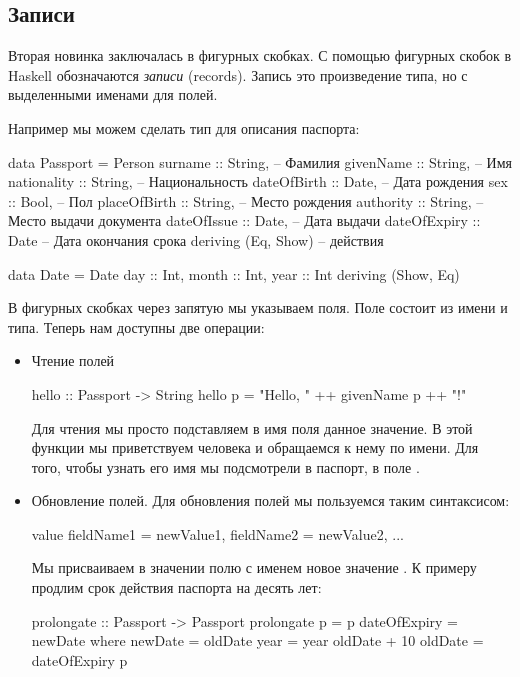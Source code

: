 \subsection{Записи}

Вторая новинка заключалась в фигурных скобках. 
С помощью фигурных скобок в Haskell обозначаются 
\emph{записи} (records). Запись это произведение
типа, но с выделенными именами для полей.

Например мы можем сделать тип для описания паспорта:

\begin{code}
data Passport   = Person {
    surname         :: String,      -- Фамилия
    givenName       :: String,      -- Имя
    nationality     :: String,      -- Национальность
    dateOfBirth     :: Date,        -- Дата рождения
    sex             :: Bool,        -- Пол
    placeOfBirth    :: String,      -- Место рождения
    authority       :: String,      -- Место выдачи документа
    dateOfIssue     :: Date,        -- Дата выдачи
    dateOfExpiry    :: Date         -- Дата окончания срока
    } deriving (Eq, Show)           --      действия

data Date   = Date {
                day     :: Int,
                month   :: Int,
                year    :: Int
              } deriving (Show, Eq)
\end{code}

В фигурных скобках через запятую мы указываем поля. 
Поле состоит из имени и типа. Теперь нам доступны
две операции:

\begin{itemize}
\item Чтение полей

\begin{code}
hello :: Passport -> String
hello p = "Hello, " ++ givenName p ++ "!"
\end{code}

Для чтения мы просто подставляем в имя 
поля данное значение. В этой функции мы приветствуем
человека и обращаемся к нему по имени. Для того, чтобы
узнать его имя мы подсмотрели в паспорт, в поле 
.

\item Обновление полей. Для обновления полей
мы пользуемся таким синтаксисом:

\begin{code}
value { fieldName1 = newValue1, fieldName2 = newValue2, ... }
\end{code}

Мы присваиваем в значении  полю с именем
 новое значение .
К примеру продлим срок действия паспорта на десять лет:

\begin{code}
prolongate :: Passport -> Passport 
prolongate p = p{ dateOfExpiry = newDate }
    where newDate = oldDate { year = year oldDate + 10 }
          oldDate = dateOfExpiry p      
\end{code}

\end{itemize}


